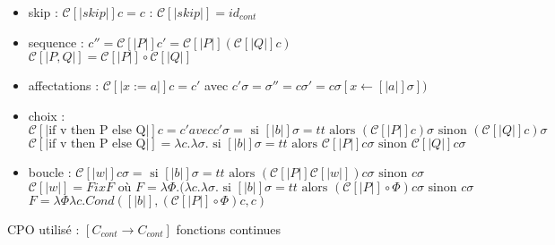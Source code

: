 \documentclass[10pt,a4paper]{article}
\newcommand{\semm}[1]{\left[| #1 | \right]}
\begin{document}
\begin{itemize}
 \item skip : $\mathcal{C}\semm{skip} c = c$ : $\mathcal{C}\semm{skip} = id_{cont}$
 \item sequence : $c'' = \mathcal{C}\semm{P} c' = \mathcal{C}\semm{P}(\mathcal{C}\semm{Q} c)$
		  $\mathcal{C}\semm{P, Q} = \mathcal{C}\semm{P} \circ \mathcal{C}\semm{Q}$
 \item affectations :  $\mathcal{C}\semm{x:=a} c = c'$ avec $c' \sigma = \sigma'' = c \sigma' = c \sigma[x \leftarrow \semm{a} \sigma])$
 \item choix : $\mathcal{C}\semm{\text{if v then P else Q}} c = c' avec c' \sigma =\text{ si }\semm{b} \sigma = tt \text{ alors } (\mathcal{C}\semm{P} c) \sigma \text{ sinon } (\mathcal{C}\semm{Q} c) \sigma$
   $\mathcal{C}\semm{\text{if v then P else Q}} = \lambda c. \lambda \sigma. \text{ si } \semm{b} \sigma = tt\text{ alors } \mathcal{C}\semm{P} c \sigma  \text{ sinon } \mathcal{C}\semm{Q} c \sigma$
 \item boucle : $\mathcal{C}\semm{w} c \sigma = \text{ si } \semm{b} \sigma = tt \text{ alors } (\mathcal{C}\semm{P} \mathcal{C}\semm{w}) c \sigma \text{ sinon } c \sigma$
 $\mathcal{C}\semm{w} = Fix F \text{ où } F = \lambda \Phi . ( \lambda c. \lambda \sigma. \text{ si } \semm{b} \sigma = tt \text{ alors } (\mathcal{C}\semm{P} \circ \Phi) c \sigma \text{ sinon } c \sigma$
$F = \lambda \Phi \lambda c . Cond ( \semm{b},  (\mathcal{C}\semm{P} \circ \Phi) c, c)$
\end{itemize}
CPO utilisé : $[C_{cont} \to C_{cont}]$ fonctions continues 
\end{document}

